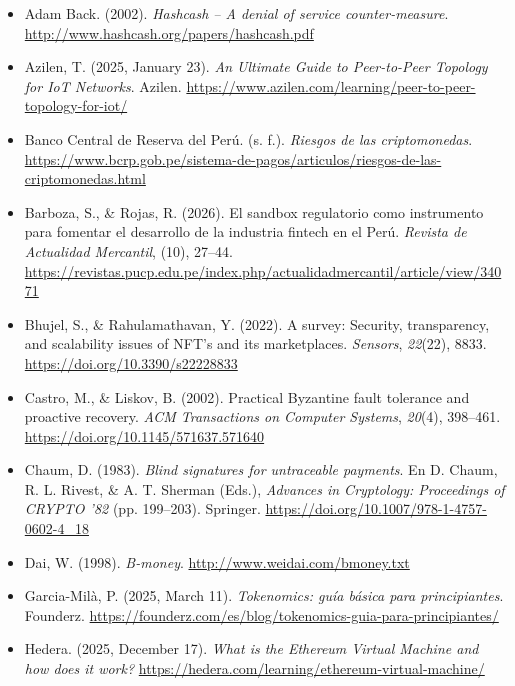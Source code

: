 \documentclass[12pt,a4paper]{article}
\begin{document}
\begin{itemize}

\item Adam Back. (2002). \textit{Hashcash -- A denial of service counter-measure}.
\url{http://www.hashcash.org/papers/hashcash.pdf}

\item Azilen, T. (2025, January 23). \textit{An Ultimate Guide to Peer-to-Peer Topology for IoT Networks}. Azilen.
\url{https://www.azilen.com/learning/peer-to-peer-topology-for-iot/}

\item Banco Central de Reserva del Perú. (s. f.). \textit{Riesgos de las criptomonedas}.
\url{https://www.bcrp.gob.pe/sistema-de-pagos/articulos/riesgos-de-las-criptomonedas.html}

\item Barboza, S., \& Rojas, R. (2026). El sandbox regulatorio como instrumento para fomentar el desarrollo de la industria fintech en el Perú. \textit{Revista de Actualidad Mercantil}, (10), 27--44.
\url{https://revistas.pucp.edu.pe/index.php/actualidadmercantil/article/view/34071}

\item Bhujel, S., \& Rahulamathavan, Y. (2022). A survey: Security, transparency, and scalability issues of NFT's and its marketplaces. \textit{Sensors}, \textit{22}(22), 8833.
\url{https://doi.org/10.3390/s22228833}

\item Castro, M., \& Liskov, B. (2002). Practical Byzantine fault tolerance and proactive recovery. \textit{ACM Transactions on Computer Systems}, \textit{20}(4), 398--461.
\url{https://doi.org/10.1145/571637.571640}

\item Chaum, D. (1983). \textit{Blind signatures for untraceable payments}. En D. Chaum, R. L. Rivest, \& A. T. Sherman (Eds.), \textit{Advances in Cryptology: Proceedings of CRYPTO '82} (pp. 199--203). Springer.
\url{https://doi.org/10.1007/978-1-4757-0602-4_18}

\item Dai, W. (1998). \textit{B-money}.
\url{http://www.weidai.com/bmoney.txt}

\item Garcia-Milà, P. (2025, March 11). \textit{Tokenomics: guía básica para principiantes}. Founderz.
\url{https://founderz.com/es/blog/tokenomics-guia-para-principiantes/}

\item Hedera. (2025, December 17). \textit{What is the Ethereum Virtual Machine and how does it work?}
\url{https://hedera.com/learning/ethereum-virtual-machine/}


\end{itemize}
\end{document}

